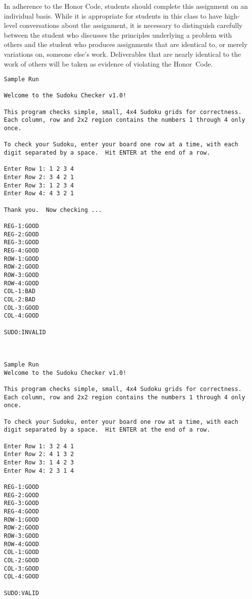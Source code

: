 In adherence to the Honor Code, students should complete this assignment on an individual basis. While it is appropriate
for students in this class to have high-level conversations about the assignment, it is necessary to distinguish
carefully between the student who discusses the principles underlying a problem with others and the student who produces
assignments that are identical to, or merely variations on, someone else's work.  Deliverables that are nearly identical
to the work of others will be taken as evidence of violating the \mbox{Honor Code}.  



\begin{verbatim}
Sample Run

Welcome to the Sudoku Checker v1.0!

This program checks simple, small, 4x4 Sudoku grids for correctness. Each column, row and 2x2 region contains the numbers 1 through 4 only once.

To check your Sudoku, enter your board one row at a time, with each digit separated by a space.  Hit ENTER at the end of a row.

Enter Row 1: 1 2 3 4
Enter Row 2: 3 4 2 1
Enter Row 3: 1 2 3 4
Enter Row 4: 4 3 2 1

Thank you.  Now checking ...

REG-1:GOOD
REG-2:GOOD
REG-3:GOOD
REG-4:GOOD
ROW-1:GOOD
ROW-2:GOOD
ROW-3:GOOD
ROW-4:GOOD
COL-1:BAD
COL-2:BAD
COL-3:GOOD
COL-4:GOOD

SUDO:INVALID



Sample Run
Welcome to the Sudoku Checker v1.0!

This program checks simple, small, 4x4 Sudoku grids for correctness. Each column, row and 2x2 region contains the numbers 1 through 4 only once.

To check your Sudoku, enter your board one row at a time, with each digit separated by a space.  Hit ENTER at the end of a row.

Enter Row 1: 3 2 4 1
Enter Row 2: 4 1 3 2
Enter Row 3: 1 4 2 3
Enter Row 4: 2 3 1 4

REG-1:GOOD
REG-2:GOOD
REG-3:GOOD
REG-4:GOOD
ROW-1:GOOD
ROW-2:GOOD
ROW-3:GOOD
ROW-4:GOOD
COL-1:GOOD
COL-2:GOOD
COL-3:GOOD
COL-4:GOOD

SUDO:VALID

\end{verbatim}




